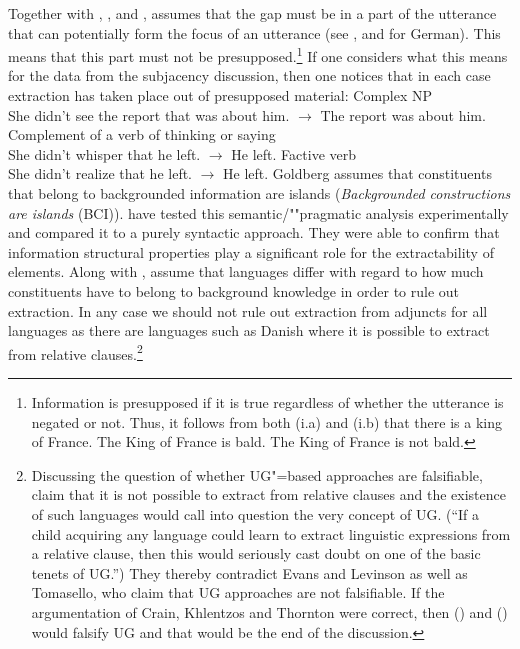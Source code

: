 \noindent
Together with \citet{Erteschik81a}, \citet{EL79a}, \citet{Takami88a}
and \citet{vanValin98a}, \citet[Section~7.2]{Goldberg2006a} assumes that the gap must be in a part of the utterance
that can potentially form the focus of an utterance (see ,  and
 for German). This means that this part must not be presupposed.\footnote{%
  Information is presupposed if it is true regardless of whether the utterance is negated or not.
  Thus, it follows from both (i.a) and (i.b) that there is a king of France.
  \eal
  \ex The King of France is bald.
  \ex The King of France is not bald.
  \zllast
}
If one considers what this means for the data from the subjacency discussion, then one notices that in each case extraction
has taken place out of presupposed material:
\eal
\ex Complex NP\\
She didn't see the report that was about him. $\to$ The report was about him.
\ex Complement of a verb of thinking or saying\\
She didn't whisper that he left. $\to$ He left.
\ex Factive verb\\
She didn't realize that he left. $\to$ He left.
\zl
Goldberg assumes that constituents that belong to backgrounded information are islands (\emph{Backgrounded constructions are islands} (BCI)).
\citet{AG2008a} have tested this semantic/""pragmatic analysis experimentally and compared it to a purely syntactic approach.
They were able to confirm that information structural properties play a significant role for the extractability
of elements. Along with \citet[Section~3.H]{Erteschik73a-u}, \citet[]{AG2008a} assume that languages differ with regard to how
much constituents have to belong to background knowledge in order to rule out extraction.
In any case we should not rule out extraction from adjuncts for all languages as there are languages such as Danish where it is possible to
extract from relative clauses.\footnote{%
Discussing the question of whether UG"=based approaches are falsifiable, \citet*[]{CKT2010a} claim that it is not possible to extract from relative clauses and the existence
of such languages would call into question the very concept of UG. (``If a child acquiring any language
could learn to extract linguistic expressions from a relative clause, then this would seriously
cast doubt on one of the basic tenets of UG.'') They thereby contradict Evans and Levinson as well as Tomasello, who claim that UG approaches are
not falsifiable. If the argumentation of Crain, Khlentzos
and Thornton were correct, then () and () would falsify UG and that would be the end of the discussion.
}

